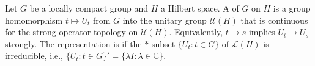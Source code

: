 \begin{definition}
Let $G$ be a locally compact group and $H$ a Hilbert space. A  of $G$ on $H$ is a group homomorphism $t \mapsto U_t$ from $G$ into the unitary group $\mathcal{U}(H)$ that is continuous for the strong operator topology on $\mathcal{U}(H)$. Equivalently, $t \to s$ implies $U_t \to U_s$ strongly. The representation is  if the $*$-subset $\{U_t : t \in G\}$ of $\mathcal{L}(H)$ is irreducible, i.e., $\{U_t : t \in G\}' = \{\lambda I : \lambda \in \mathbb{C}\}$.
\end{definition}
